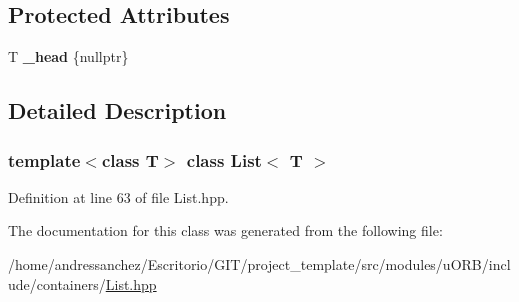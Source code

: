 \subsection*{Protected Attributes}
\begin{DoxyCompactItemize}
\item 
\mbox{\label{classList_a049bde788f66e78f5ddc762e541f23df}} 
T {\bfseries \+\_\+head} \{nullptr\}
\end{DoxyCompactItemize}


\subsection{Detailed Description}
\subsubsection*{template$<$class T$>$\newline
class List$<$ T $>$}



Definition at line 63 of file List.\+hpp.



The documentation for this class was generated from the following file\+:\begin{DoxyCompactItemize}
\item 
/home/andressanchez/\+Escritorio/\+G\+I\+T/project\+\_\+template/src/modules/u\+O\+R\+B/include/containers/\hyperlink{List_8hpp}{List.\+hpp}\end{DoxyCompactItemize}
